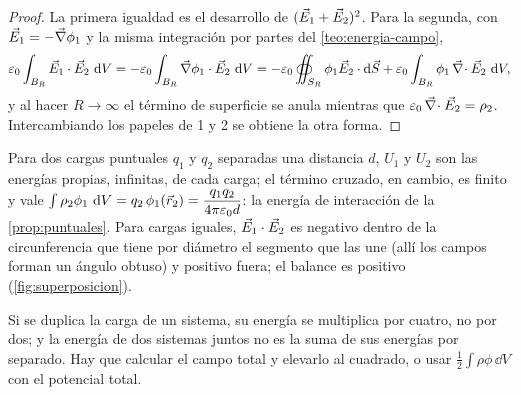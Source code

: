 \begin{proof}
La primera igualdad es el desarrollo de $(\vec E_1+\vec E_2)^2$. Para la segunda, con $\vec E_1=-\vec\nabla\phi_1$ y la misma integración por partes
del \cref{teo:energia-campo},
\[
  \varepsilon_0\int_{B_R}\vec E_1\cdot\vec E_2\,\mathop{}\!\mathrm{d} V=-\varepsilon_0\int_{B_R}\vec\nabla\phi_1\cdot\vec E_2\,\mathop{}\!\mathrm{d} V=-\varepsilon_0\oiint_{S_R}\phi_1\vec E_2\cdot\mathop{}\!\mathrm{d}\vec S+\varepsilon_0\int_{B_R}\phi_1\,\vec\nabla\!\cdot\vec E_2\,\mathop{}\!\mathrm{d} V ,
\]
y al hacer $R\to\infty$ el término de superficie se anula mientras que $\varepsilon_0\,\vec\nabla\!\cdot\vec E_2=\rho_2$. Intercambiando los papeles de 1 y 2 se obtiene la
otra forma.
\end{proof}

\begin{ejemplo}\label{ej:termino-cruzado}
Para dos cargas puntuales $q_1$ y $q_2$ separadas una distancia $d$, $U_1$ y $U_2$ son las energías propias, infinitas, de cada carga; el
término cruzado, en cambio, es finito y vale $\int\rho_2\phi_1\,\mathop{}\!\mathrm{d} V=q_2\,\phi_1(\vec r_2)=\dfrac{q_1q_2}{4\pi\varepsilon_0 d}$: la energía de interacción de la
\cref{prop:puntuales}. Para cargas iguales, $\vec E_1\cdot\vec E_2$ es negativo dentro de la circunferencia que tiene por diámetro el segmento que
las une (allí los campos forman un ángulo obtuso) y positivo fuera; el balance es positivo (\cref{fig:superposicion}).
\end{ejemplo}



\begin{trampa}
Si se duplica la carga de un sistema, su energía se multiplica por cuatro, no por dos; y la energía de dos sistemas juntos no es la suma
de sus energías por separado. Hay que calcular el campo total y elevarlo al cuadrado, o usar $\frac12\int\rho\phi\,\dd V$ con el potencial
total.
\end{trampa}
